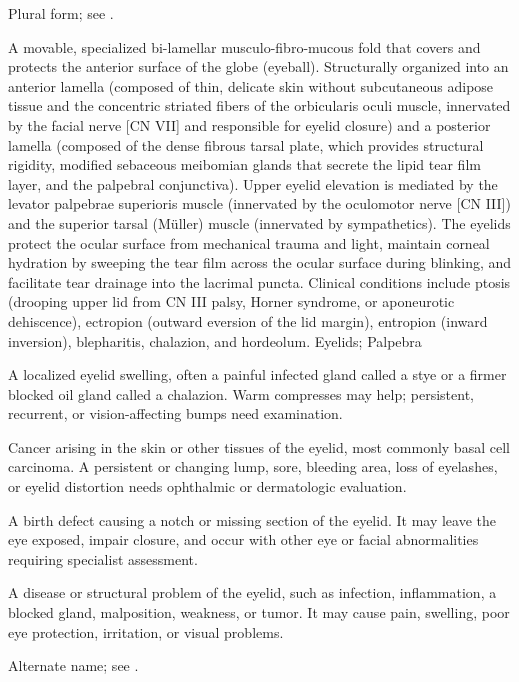  Plural form; see .

 A movable, specialized bi-lamellar musculo-fibro-mucous fold that covers and protects the anterior surface of the globe (eyeball). Structurally organized into an anterior lamella (composed of thin, delicate skin without subcutaneous adipose tissue and the concentric striated fibers of the orbicularis oculi muscle, innervated by the facial nerve [CN VII] and responsible for eyelid closure) and a posterior lamella (composed of the dense fibrous tarsal plate, which provides structural rigidity, modified sebaceous meibomian glands that secrete the lipid tear film layer, and the palpebral conjunctiva). Upper eyelid elevation is mediated by the levator palpebrae superioris muscle (innervated by the oculomotor nerve [CN III]) and the superior tarsal (Müller) muscle (innervated by sympathetics). The eyelids protect the ocular surface from mechanical trauma and light, maintain corneal hydration by sweeping the tear film across the ocular surface during blinking, and facilitate tear drainage into the lacrimal puncta. Clinical conditions include ptosis (drooping upper lid from CN III palsy, Horner syndrome, or aponeurotic dehiscence), ectropion (outward eversion of the lid margin), entropion (inward inversion), blepharitis, chalazion, and hordeolum.
\synonyms
Eyelids; Palpebra

 A localized eyelid swelling, often a painful infected gland called a stye or a firmer blocked oil gland called a chalazion. Warm compresses may help; persistent, recurrent, or vision-affecting bumps need examination.

 Cancer arising in the skin or other tissues of the eyelid, most commonly basal cell carcinoma. A persistent or changing lump, sore, bleeding area, loss of eyelashes, or eyelid distortion needs ophthalmic or dermatologic evaluation.

 A birth defect causing a notch or missing section of the eyelid. It may leave the eye exposed, impair closure, and occur with other eye or facial abnormalities requiring specialist assessment.

 A disease or structural problem of the eyelid, such as infection, inflammation, a blocked gland, malposition, weakness, or tumor. It may cause pain, swelling, poor eye protection, irritation, or visual problems.

 Alternate name; see .

